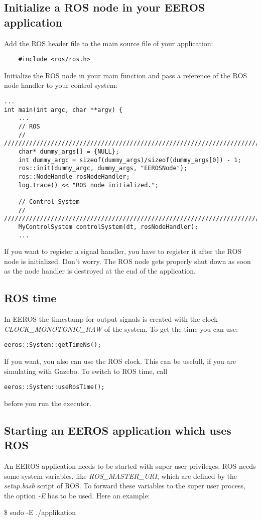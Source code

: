 \subsection{Initialize a ROS node in your EEROS application}
Add the ROS header file to the main source file of your application:
\lstset{language=c}
\begin{lstlisting}
	#include <ros/ros.h>
\end{lstlisting}

Initialize the ROS node in your main function and pass a reference of the ROS node handler to your control system:	
\lstset{language=c}
\begin{lstlisting}
...
int main(int argc, char **argv) {
	...
	// ROS
	// ////////////////////////////////////////////////////////////////////////
	char* dummy_args[] = {NULL};
	int dummy_argc = sizeof(dummy_args)/sizeof(dummy_args[0]) - 1;
 	ros::init(dummy_argc, dummy_args, "EEROSNode");
	ros::NodeHandle rosNodeHandler;
	log.trace() << "ROS node initialized.";
	
	// Control System
	// ////////////////////////////////////////////////////////////////////////
	MyControlSystem controlSystem(dt, rosNodeHandler);
	...
\end{lstlisting}

If you want to register a signal handler, you have to register it after the ROS node is initialized.
Don't worry.
The ROS node gets properly shut down as soon as the node handler is destroyed at the end of the application.


\subsection{ROS time}
In EEROS the timestamp for output signals is created with the clock \textit{CLOCK\_MONOTONIC\_RAW} of the system.
To get the time you can use:
\lstset{language=c}
\begin{lstlisting}
eeros::System::getTimeNs();
\end{lstlisting}

If you want, you also can use the ROS clock. 
This can be usefull, if you are simulating with Gazebo.
To switch to ROS time, call
\lstset{language=c}
\begin{lstlisting}
eeros::System::useRosTime();
\end{lstlisting}
before you run the executor.


\subsection{Starting an EEROS application which uses ROS}
An EEROS application needs to be started with super user privileges.
ROS needs some system variables, like \textit{ROS\_MASTER\_URI}, which are defined by the \textit{setup.bash} script of ROS.
To forward these variables to the super user process, the option \textit{-E} has to be used. Here an example:
\begin{snugshade*}
	\$ sudo -E ./applikation
\end{snugshade*}


